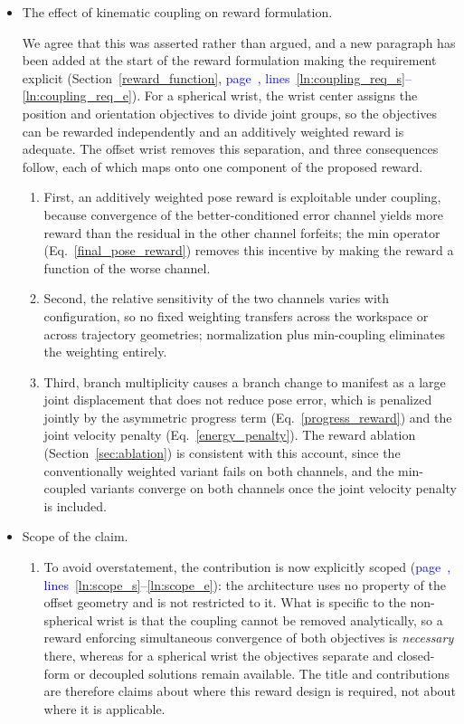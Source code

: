 \documentclass[11pt]{elsarticle}
\newcommand{\mlines}[2]{\textcolor{blue}{page~\pageref{#1}, lines~\ref{#1}--\ref{#2}}}
\begin{document}
\begin{responsebox}
\begin{itemize}
  \item The effect of kinematic coupling on reward formulation. 
 
  We agree that this was asserted rather than argued, and a new paragraph has been added at the start of the reward formulation making the requirement explicit (Section~\ref{reward_function}, \mlines{ln:coupling_req_s}{ln:coupling_req_e}). For a spherical wrist, the wrist center assigns the position and orientation objectives to divide joint groups, so the objectives can be rewarded independently and an additively weighted reward is adequate. The offset wrist removes this separation, and three consequences follow, each of which maps onto one component of the proposed reward. 
  \begin{enumerate}
      \item First, an additively weighted pose reward is exploitable under coupling, because convergence of the better-conditioned error channel yields more reward than the residual in the other channel forfeits; the min operator (Eq.~\ref{final_pose_reward}) removes this incentive by making the reward a function of the worse channel.

      \item Second, the relative sensitivity of the two channels varies with configuration, so no fixed weighting transfers across the workspace or across trajectory geometries; normalization plus min-coupling eliminates the weighting entirely.

      \item Third, branch multiplicity causes a branch change to manifest as a large joint displacement that does not reduce pose error, which is penalized jointly by the asymmetric progress term (Eq.~\ref{progress_reward}) and the joint velocity penalty (Eq.~\ref{energy_penalty}). The reward ablation (Section~\ref{sec:ablation}) is consistent with this account, since the conventionally weighted variant fails on both channels, and the min-coupled variants converge on both channels once the joint velocity penalty is included.
  \end{enumerate}
   
  \item Scope of the claim. 
\begin{enumerate}
    \item To avoid overstatement, the contribution is now explicitly scoped (\mlines{ln:scope_s}{ln:scope_e}): the architecture uses no property of the offset geometry and is not restricted to it. What is specific to the non-spherical wrist is that the coupling cannot be removed analytically, so a reward enforcing simultaneous convergence of both objectives is \emph{necessary} there, whereas for a spherical wrist the objectives separate and closed-form or decoupled solutions remain available. The title and contributions are therefore claims about where this reward design is required, not about where it is applicable. 
\end{enumerate}  
  
\end{itemize}
\end{responsebox}
\end{document}
